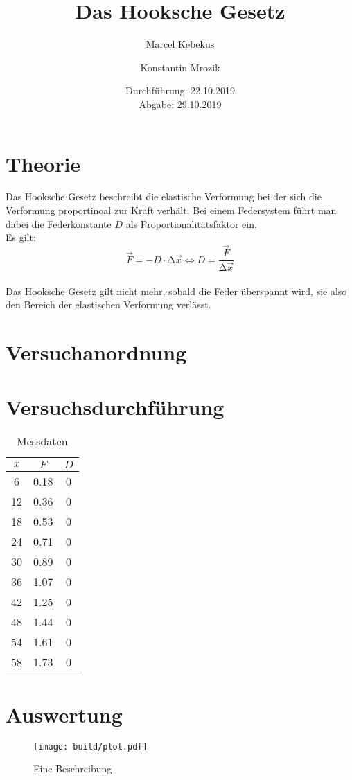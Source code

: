 \documentclass[titlepage = firstcover]{scrartcl}
\title{Das Hooksche Gesetz}
\author{Marcel Kebekus \and Konstantin Mrozik}
\date{%
  Durchführung: 22.10.2019 \\
  Abgabe: 29.10.2019
  }
\begin{document}
\maketitle
\thispagestyle{empty}
\tableofcontents
\newpage

\section{Theorie}
\label{sec:Theorie}
Das Hooksche Gesetz beschreibt die elastische Verformung bei der sich die Verformung
proportinoal zur Kraft verhält.
Bei einem Federsystem führt man dabei die Federkonstante $D$ als Proportionalitätsfaktor ein.\\
Es gilt:
\\
\begin{equation}
  \vec{F}=-D \cdot \increment\vec{x} \iff D=\frac{\vec{F}}{\increment\vec{x}}
\end{equation}
\\
Das Hooksche Gesetz gilt nicht mehr, sobald die Feder überspannt wird, sie also den Bereich der
elastischen Verformung verlässt.

\section{Versuchanordnung}
\label{sec:Versuchsanordnung}

\section{Versuchsdurchführung}
\label{sec:Versuchsdurchführung}

\begin{table}
  \centering
  \caption{Messdaten}
  \label{tab:table}
  \begin{tabular}{c c c}
    \toprule
  $ x$ & $F$  & $D$  \\
    \midrule
  6  &	0.18 & 0 \\	
  12 &	0.36 & 0	\\
  18 &	0.53 & 0	\\
  24 &	0.71 & 0	\\
  30 &	0.89 & 0 \\
  36 &	1.07 & 0 \\
  42 & 	1.25 & 0 \\
  48 &	1.44 & 0 \\
  54 &	1.61 & 0 \\
  58 &	1.73 & 0 \\
  \bottomrule
\end{tabular}
\end{table}

\section{Auswertung}
\label{sec:Auswertung}


\begin{figure}
  \centering
  \texttt{[image: build/plot.pdf]}
  \caption{Eine Beschreibung}
  \label{fig:Plot}
\end{figure}
\end{document}
